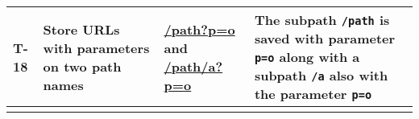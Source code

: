 \begin{tabularx}{\textwidth}{p{} p{} p{} p{}}
  \midrule
  T-18        & Store URLs with parameters on two path names       & \url{/path?p=o} and \url{/path/a?p=o} & The subpath \texttt{/path} is saved with parameter \texttt{p=o} along with a subpath \texttt{/a} also with the parameter \texttt{p=o}                                                                                                     \\
  \bottomrule
  \label{table:urlTestsDefinitions}
\end{tabularx}
